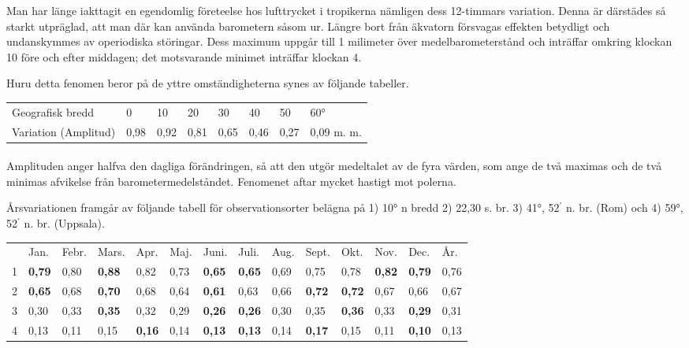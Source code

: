 \documentclass[a4paper, 12pt, oneside, swedish]{article}
\begin{document}
Man har länge iakttagit en egendomlig företeelse hos lufttrycket i tropikerna nämligen dess 12-timmars variation. Denna är därstädes så starkt utpräglad, att man där kan använda barometern såsom ur. Längre bort från äkvatorn försvagas effekten betydligt och undanskymmes av operiodiska störingar. Dess maximum uppgår till 1 milimeter över medelbarometerstånd och inträffar omkring klockan 10 före och efter middagen; det motsvarande minimet inträffar klockan 4.

Huru detta fenomen beror på de yttre omständigheterna synes av följande tabeller.

\begin{table}[H]
    \centering
    \footnotesize
    \begin{tabular}{l l l l l l l l}
        Geografisk bredd & 0 & 10 & 20 & 30 & 40 & 50 & 60°   \\
        Variation (Amplitud) & 0,98 & 0,92 & 0,81 & 0,65 & 0,46 & 0,27 & 0,09 m. m. \\
    \end{tabular}
\end{table}
\paragraph{}
Amplituden anger halfva den dagliga förändringen, så att den utgör medeltalet av de fyra värden, som ange de två maximas och de två minimas afvikelse från barometermedelståndet. Fenomenet aftar mycket hastigt mot polerna.

Årsvariationen framgår av följande tabell för observationsorter belägna på 1) 10° n bredd 2) 22,30 s. br. 3) 41°, 52$^{\prime}$ n. br. (Rom) och 4) 59°, 52$^{\prime}$ n. br. (Uppsala).

\begin{table}[H]
    \centering
    \footnotesize
    \begin{tabular}{p{3mm} p{5mm} p{5mm} p{6mm} p{5mm} p{5mm} p{5mm} p{5mm} p{5mm} p{5mm} p{5mm} p{5mm} p{5mm} p{5mm}}
        ~ & Jan. & Febr. & Mars. & Apr. & Maj. & Juni. & Juli. & Aug. & Sept. & Okt. & Nov. & Dec. & År. \\
        1 & \textbf{0,79} & 0,80 & \textbf{0,88} & 0,82 & 0,73 & \textbf{0,65} & \textbf{0,65} & 0,69 & 0,75 & 0,78 & \textbf{0,82} & \textbf{0,79} & 0,76 \\
        2 & \textbf{0,65} & 0,68 & \textbf{0,70} & 0,68 & 0,64 & \textbf{0,61} & 0,63 & 0,66 & \textbf{0,72} & \textbf{0,72} & 0,67 & 0,66 & 0,67 \\
        3 & 0,30 & 0,33 & \textbf{0,35} & 0,32 & 0,29 & \textbf{0,26} & \textbf{0,26} & 0,30 & 0,35 & \textbf{0,36} & 0,33 & \textbf{0,29} & 0,31 \\
        4 & 0,13 & 0,11 & 0,15 & \textbf{0,16} & 0,14 & \textbf{0,13} & \textbf{0,13} & 0,14 & \textbf{0,17} & 0,15 & 0,11 & \textbf{0,10} & 0,13 \\
    \end{tabular}
\end{table}
\end{document}
